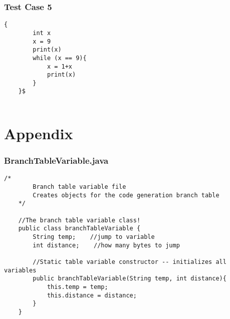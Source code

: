 \documentclass[letterpaper, 10pt,DIV=13]{scrartcl}
\numberwithin{equation}{section} %
\numberwithin{figure}{section} %
\numberwithin{table}{section} %
\begin{document}
\subsubsection*{Test Case 5}
    \lstset{numbers=left, numberstyle=\tiny, stepnumber=1, numbersep=5pt, basicstyle=\footnotesize\ttfamily}
    \begin{lstlisting}[frame=single, ]
    {
        int x
        x = 9
        print(x)
        while (x == 9){
            x = 1+x
            print(x)
        }
    }$
        
    \end{lstlisting}



\pagebreak


\section*{Appendix}

\subsubsection*{BranchTableVariable.java}
    \lstset{numbers=left, numberstyle=\tiny, stepnumber=1, numbersep=5pt, basicstyle=\footnotesize\ttfamily}
    \begin{lstlisting}[frame=single, ]
    /*
        Branch table variable file
        Creates objects for the code generation branch table
    */
    
    //The branch table variable class!
    public class branchTableVariable {
        String temp;    //jump to variable
        int distance;    //how many bytes to jump
    
        //Static table variable constructor -- initializes all variables
        public branchTableVariable(String temp, int distance){
            this.temp = temp;
            this.distance = distance;
        }
    }
    \end{lstlisting}
\end{document}
